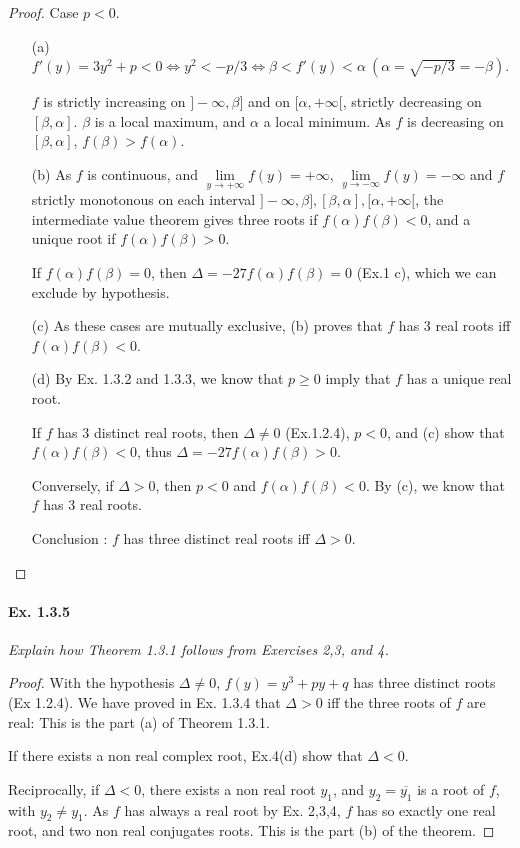 \documentclass[11pt,a4paper]{article}
\begin{document}
\begin{proof}
Case $p<0$.
\begin{enumerate}

\item[(a)]
$f'(y) = 3y^2+p < 0 \iff y^2<-p/3 \iff \beta < f'(y) < \alpha\  (\alpha = \sqrt{-p/3} = -\beta)$.

$f$ is strictly increasing on $]-\infty,\beta]$ and on $[\alpha, +\infty[$, strictly decreasing on $[\beta,\alpha]$. $\beta$ is a local maximum, and $\alpha$ a local minimum. As $f$ is decreasing on  $[\beta,\alpha]$, $f(\beta) > f(\alpha)$.

\item[(b)] As $f$ is continuous, and  $\lim\limits_{y\to +\infty} f(y) = +\infty$,  $\lim\limits_{y\to -\infty} f(y) = -\infty$ and $f$ strictly  monotonous on each interval $]-\infty,\beta],[\beta,\alpha],[\alpha, +\infty[$, the intermediate value theorem gives three roots if $f(\alpha)f(\beta)<0$, and a unique root if $f(\alpha) f(\beta)>0$.

If  $f(\alpha)f(\beta) = 0$, then  $\Delta = -27 f(\alpha)f(\beta) = 0$ (Ex.1 c), which we can exclude by hypothesis.

\item[(c)] As these cases are mutually exclusive, (b) proves that $f$ has 3 real roots iff $f(\alpha)f(\beta)<0$. 

\item[(d)]
By Ex. 1.3.2 and 1.3.3, we know that $p\geq 0$ imply that $f$ has a unique real root. 

If $f$ has 3 distinct real roots, then $\Delta \neq 0$ (Ex.1.2.4), $p<0$, and (c) show that $f(\alpha)f(\beta) <0$, thus $\Delta = -27 f(\alpha)f(\beta) >0$.

Conversely, if $\Delta>0$, then $p<0$ and $f(\alpha)f(\beta)<0$. By (c), we know that $f$ has 3 real roots.

Conclusion :  $f$ has three distinct real roots iff  $\Delta >0$.

\end{enumerate}

\end{proof}

\paragraph{Ex. 1.3.5}

{\it Explain how Theorem 1.3.1 follows from Exercises 2,3, and 4.
}

\begin{proof}
With the hypothesis $\Delta \neq 0$, $f(y) = y^3+py+q$ has three distinct roots (Ex 1.2.4). We have proved in Ex. 1.3.4 that $\Delta >0$ iff the three roots of $f$ are real: This is the part (a) of Theorem 1.3.1.

If there exists a non real complex root, Ex.4(d) show that $\Delta <0$.

Reciprocally, if $\Delta <0$, there exists a non real root $y_1$, and $y_2 = \overline{y_1}$ is a root of $f$, with $y_2 \ne y_1$. As $f$ has always a real root by Ex. 2,3,4, $f$ has so exactly one real root, and two non real conjugates roots. This is the part (b) of the theorem.
\end{proof}
\end{document}
